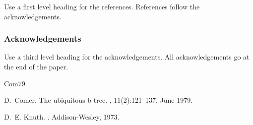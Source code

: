 \documentclass[a4paper]{article}
\begin{document}
Use a first level heading for the references. References follow the
acknowledgements.


\subsubsection{Acknowledgements}

Use a third level heading for the acknowledgements. All acknowledgements
go at the end of the paper.




% 
%

\begin{thebibliography}{Com79}

D.~Comer.
\newblock The ubiquitous b-tree.
, 11(2):121--137, June 1979.

D.~E. Knuth.
.
\newblock Addison-Wesley, 1973.

\end{thebibliography}
\end{document}
